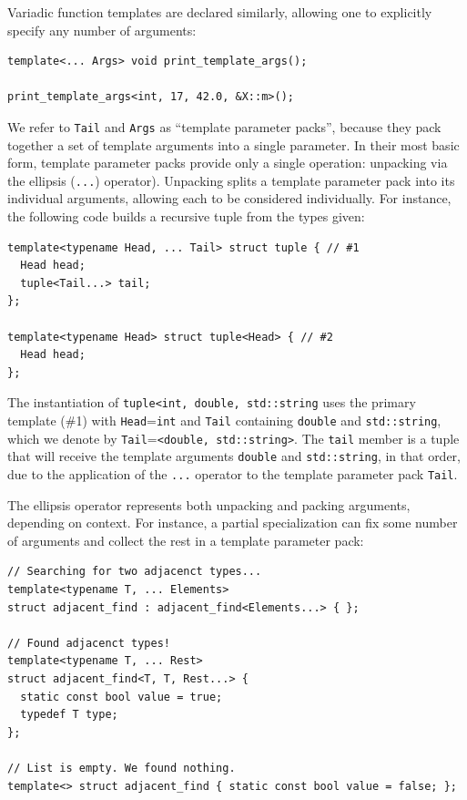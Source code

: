 \documentclass{article}
\begin{document}
Variadic function templates are declared similarly, allowing one to
explicitly specify any number of arguments:
\begin{verbatim}
template<... Args> void print_template_args();

print_template_args<int, 17, 42.0, &X::m>();
\end{verbatim}

We refer to \texttt{Tail} and \texttt{Args} as ``template parameter
packs'', because they pack together a set of template arguments into a
single parameter. In their most basic form, template parameter packs
provide only a single operation: unpacking via the ellipsis
(\texttt{...}) operator). Unpacking splits a template parameter pack
into its individual arguments, allowing each to be considered
individually. For instance, the following code builds a recursive
tuple from the types given:
\begin{verbatim}
template<typename Head, ... Tail> struct tuple { // #1
  Head head;
  tuple<Tail...> tail;
};

template<typename Head> struct tuple<Head> { // #2
  Head head;
};
\end{verbatim}

The instantiation of \texttt{tuple<int, double, std::string} uses the
primary template (\#1) with \texttt{Head}=\texttt{int} and
\texttt{Tail} containing \texttt{double} and \texttt{std::string},
which we denote by \texttt{Tail}=\texttt{<double, std::string>}. The
\texttt{tail} member is a tuple that will receive the template arguments
\texttt{double} and \texttt{std::string}, in that order, due to the
application of the \texttt{...} operator to the template parameter
pack \texttt{Tail}. 

The ellipsis operator represents both unpacking and packing arguments,
depending on context. For instance, a partial specialization can fix
some number of arguments and collect the rest in a template parameter
pack:

\begin{verbatim}
// Searching for two adjacenct types...
template<typename T, ... Elements> 
struct adjacent_find : adjacent_find<Elements...> { };

// Found adjacenct types!
template<typename T, ... Rest>
struct adjacent_find<T, T, Rest...> {
  static const bool value = true; 
  typedef T type;
};

// List is empty. We found nothing.
template<> struct adjacent_find { static const bool value = false; };
\end{verbatim}
\end{document}
